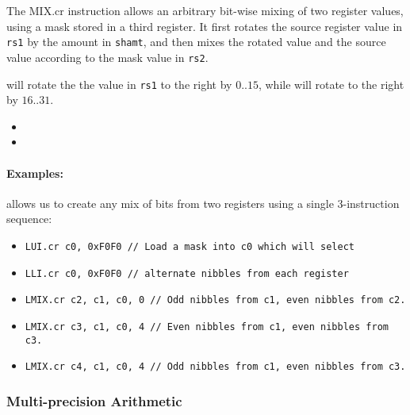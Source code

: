 {\ienclmixcr\ienchmixcr}
{
The MIX.cr instruction allows an arbitrary bit-wise mixing of two
register values, using a mask stored in a third register.
It first rotates  the source register value in {\tt rs1} by the amount in
{\tt shamt}, and then mixes the rotated value and the source value according
to the mask value in {\tt rs2}.

 will rotate the the value in {\tt rs1} to the right by $0..15$,
while  will rotate to the right by $16..31$. 
}{
\begin{itemize}
\item {}
\item {}
\end{itemize}
}{
\paragraph{Examples:}
 allows us to create any mix of bits from two registers
using a single 3-instruction sequence:

\begin{itemize}
\item{\tt LUI.cr   c0, 0xF0F0     // Load a mask into c0 which will select}
\item{\tt LLI.cr   c0, 0xF0F0     // alternate nibbles from each register}
\item{\tt LMIX.cr  c2, c1, c0, 0  // Odd nibbles from c1, even nibbles from c2.}
\item{\tt LMIX.cr  c3, c1, c0, 4  // Even nibbles from c1, even nibbles from c3.}
\item{\tt LMIX.cr  c4, c1, c0, 4  // Odd  nibbles from c1, even nibbles from c3.}
\end{itemize}
}


\subsubsection{Multi-precision Arithmetic}
\label{sec:spec:instr:mp}

